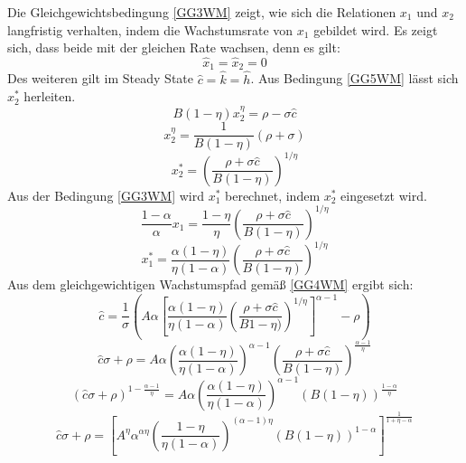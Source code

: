 Die Gleichgewichtsbedingung \eqref{GG3WM} zeigt, wie sich die Relationen $x_1$ und $x_2$ langfristig verhalten, indem die Wachstumsrate von $x_1$ gebildet wird. Es zeigt sich, dass beide mit der gleichen Rate wachsen, denn es gilt:
\begin{equation}
\hat{x}_1=\hat{x}_2=0
\end{equation}
Des weiteren gilt im Steady State $\hat{c}=\hat{k}=\hat{h}$.
Aus Bedingung \eqref{GG5WM} lässt sich $x_2^*$ herleiten.
\begin{equation}
B(1-\eta)x_2^\eta=\rho-\sigma\hat{c}
\end{equation}
\begin{equation*}
x_2^\eta=\frac{1}{B(1-\eta)}(\rho+\sigma)
\end{equation*}
\begin{equation}
x_2^*=\left(\frac{\rho+\sigma\hat{c}}{B(1-\eta)}\right)^{1/\eta}
\end{equation}
Aus der Bedingung \eqref{GG3WM} wird $x_1^*$ berechnet, indem $x_2^*$ eingesetzt wird.
\begin{equation}
\frac{1-\alpha}{\alpha}x_1 =\frac{1-\eta}{\eta}\left(\frac{\rho+\sigma\hat{c}}{B(1-\eta)}\right)^{1/\eta}
\end{equation}
\begin{equation}
x_1^* =\frac{\alpha(1-\eta)}{\eta(1-\alpha)}\left(\frac{\rho+\sigma\hat{c}}{B(1-\eta)}\right)^{1/\eta}
\end{equation}
Aus dem gleichgewichtigen Wachstumspfad gemä{\ss} \eqref{GG4WM} ergibt sich: 
\begin{equation}
\hat{c}=\frac{1}{\sigma}\left(A\alpha \left[\frac{\alpha(1-\eta)}{\eta(1-\alpha)}\left(\frac{\rho+\sigma\hat{c}}{B1-\eta)}\right)^{1/\eta}\right]^{\alpha-1}-\rho\right)
\end{equation}
\begin{equation*}
\hat{c}\sigma+\rho=A\alpha\left(\frac{\alpha(1-\eta)}{\eta(1-\alpha)}\right)^{\alpha-1}\left(\frac{\rho+\sigma\hat{c}}{B(1-\eta)}\right)^{\frac{\alpha-1}{\eta}}
\end{equation*}
\begin{equation*}
(\hat{c}\sigma+\rho)^{1-\frac{\alpha-1}{\eta}}=A\alpha\left(\frac{\alpha(1-\eta)}{\eta(1-\alpha)}\right)^{\alpha-1}\left(B(1-\eta)\right)^{\frac{1-\alpha}{\eta}}
\end{equation*}
\begin{equation*}
\hat{c}\sigma+\rho=\left[A^\eta\alpha^{\alpha\eta}\left(\frac{1-\eta}{\eta(1-\alpha)}\right)^{(\alpha-1)\eta}\left(B(1-\eta)\right)^{1-\alpha}\right]^\frac{1}{1+\eta-\alpha}
\end{equation*}
